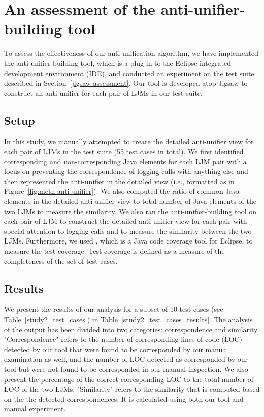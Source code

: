 \section{An assessment of the anti-unifier-building tool}\label{anti-unifier-assessment}
To assess the effectiveness of our anti-unification algorithm, we have implemented the anti-unifier-building tool, which is a plug-in to the Eclipse integrated development environment (IDE), and conducted an experiment on the test suite described in Section~\ref{jigsaw-assessment}. Our tool is developed atop Jigsaw to construct an anti-unifier for each pair of LJMs in our test suite.


\subsection{Setup}  \label{study2-setup}
In this study, we manually attempted to create the detailed anti-unifier view for each pair of LJMs in the test suite (55 test cases in total). We first identified corresponding and non-corresponding Java elements for each LJM pair with a focus on preventing the correspondence of logging calls with anything else and then represented the anti-unifier in the detailed view (i.e., formatted as in Figure~\ref{fig:meth-anti-unifier}). We also computed the ratio of common Java elements in the detailed anti-unifier view to total number of Java elements of the two LJMs to measure the similarity.  
We also ran the anti-unifier-building tool on each pair of LJM to construct the detailed anti-unifier view for each pair with special attention to logging calls and to measure the similarity between the two LJMs. Furthermore, we used , which is a Java code coverage tool for Eclipse, to measure the test coverage. Test coverage is defined as a measure of the completeness of the set of test cases. 



\subsection{Results}  \label{study2-results}
We present the results of our analysis for a subset of 10 test cases (see Table~\ref{study2_test_cases}) in Table~\ref{study2_test_cases_results}. The analysis of the output has been divided into two categories: correspondence and similarity. "Correspondence" refers to the number of corresponding lines-of-code (LOC) detected by our tool that were found to be corresponded by our manual examination as well, and the number of LOC detected as corresponded by our tool but were not found to be corresponded in our manual inspection. We also present the percentage of the correct corresponding LOC to the total number of LOC of the two LJMs. "Similarity" refers to the similarity that is computed based on the the detected correspondences. It is calculated using both our tool and manual experiment.


